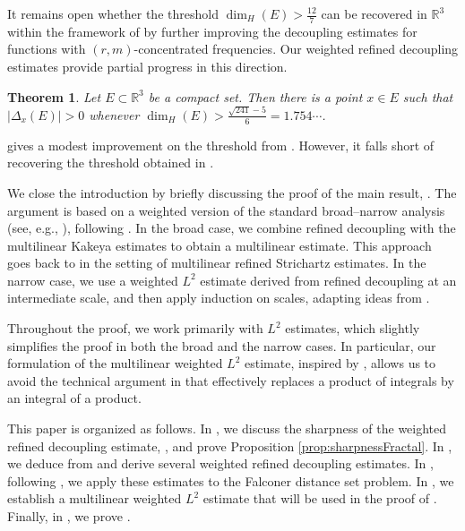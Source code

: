 \documentclass[11pt]{amsart}
\newtheorem{theorem}{Theorem}[section]
\theoremstyle{definition}
\theoremstyle{remark}
\numberwithin{equation}{section}
\newcommand{\R}{\mathbb{R}}
\begin{document}
It remains open whether the threshold 
$\dim_H(E) > \frac{12}{7}$ can be recovered  in $\R^3$ within the framework of \cite{du2023weighted} by further improving the decoupling estimates for functions with $(r,m)$-concentrated frequencies. Our weighted refined decoupling estimates provide partial progress in this direction.
\begin{theorem}\label{thm:Falconer}
	Let $E\subset \R^3$ be a compact set. Then there is a point $x\in E$ such that $|\Delta_x(E)|>0$ whenever $\dim_H(E)>
	\frac{\sqrt{241}-5}{6} = 1.754\cdots$.
\end{theorem}
 gives a modest improvement on the threshold from \cite{du2023weighted}. However, it falls short of recovering the threshold obtained in \cite{du2023Falconer}.



We close the introduction by briefly discussing the proof of the main result,
.
The argument is based on a weighted version of the standard broad--narrow analysis (see, e.g., \cite{BG, Guth2, DZ}), following \cite{KimWeightedDec}. In the broad case, we combine refined decoupling \cite{GIOW, du2023weighted} with the multilinear Kakeya estimates \cite{BCT} to obtain a multilinear estimate. This approach goes back to \cite{DGL, DGLZ} in the setting of multilinear refined Strichartz estimates. In the narrow case, we use a weighted $L^2$ estimate derived from refined decoupling at an intermediate scale, and then apply induction on scales, adapting ideas from \cite{DZ, du2023weighted}. 

Throughout the proof, we work primarily with $L^2$ estimates, which slightly simplifies the proof in both the broad and the narrow cases. In particular, our formulation of the multilinear weighted $L^2$ estimate, inspired by \cite{DemRefined}, allows us to avoid the technical argument in \cite{DZ} that effectively replaces a product of integrals by an integral of a product. 
 
This paper is organized as follows. In , we discuss the sharpness of the weighted refined decoupling estimate, ,  and prove Proposition \ref{prop:sharpnessFractal}. In , we deduce   from  and derive several weighted refined decoupling estimates. 
In , following \cite{du2023weighted}, we apply these estimates to the Falconer distance set problem.
 In , we establish a multilinear weighted $L^2$ estimate that will be used in the proof of . 
Finally, in , we prove .
\end{document}
